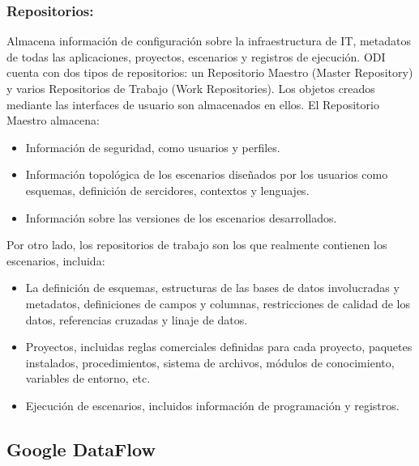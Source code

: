 \subsubsection{Repositorios:} 
Almacena información de configuración sobre la infraestructura de IT, metadatos de todas las aplicaciones, proyectos, 
escenarios y registros de ejecución. ODI cuenta con dos tipos de repositorios: un Repositorio Maestro (Master Repository) 
y varios Repositorios de Trabajo (Work Repositories). Los objetos creados mediante las interfaces de usuario son almacenados 
en ellos. El Repositorio Maestro almacena:

\begin{itemize}
    \item Información de seguridad, como usuarios y perfiles.
    \item Información topol\'ogica de los escenarios diseñados por los usuarios como esquemas, definici\'on de sercidores, 
        contextos y lenguajes.
    \item Información sobre las versiones de los escenarios desarrollados.
\end{itemize}

Por otro lado, los repositorios de trabajo son los que realmente 
contienen los escenarios, incluida: 

\begin{itemize}
    \item La definición de esquemas, estructuras de las bases de datos involucradas y metadatos, 
        definiciones de campos y columnas, restricciones de calidad de los datos, referencias cruzadas y linaje de datos.
    \item Proyectos, incluidas reglas comerciales definidas para cada proyecto, paquetes instalados, procedimientos, 
        sistema de archivos, módulos de conocimiento, variables de entorno, etc.
    \item Ejecución de escenarios, incluidos información de programación y registros.

\end{itemize}




\subsection{Google DataFlow}